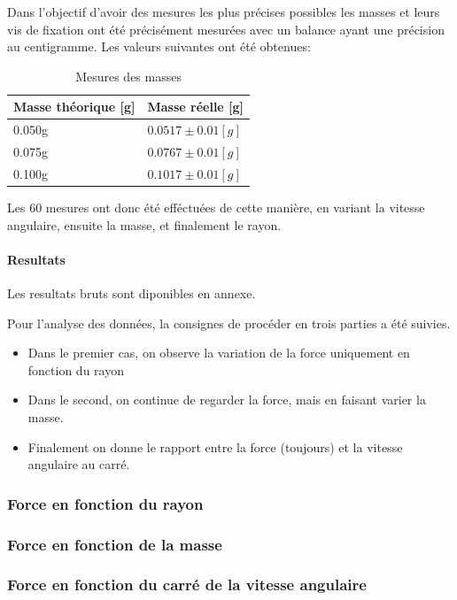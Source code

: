 Dans l'objectif d'avoir des mesures les plus précises possibles les masses et leurs vis de fixation ont été précisément mesurées avec un balance ayant une précision au centigramme. Les valeurs suivantes ont été obtenues:
\begin{table}[ht]
    \caption[Mesure des masses]{Mesures des masses}
    \centering
    \begin{tabular}{|l|l|}
	\hline
	Masse théorique [g] & Masse réelle [g]\\
	\hline
	0.050g & $0.0517 \pm 0.01 [g]$\\
	0.075g & $0.0767 \pm 0.01 [g]$\\
	0.100g & $0.1017 \pm 0.01 [g]$\\
	\hline
    \end{tabular}
\end{table}

Les 60 mesures ont donc été efféctuées de cette manière, en variant la vitesse angulaire, ensuite la masse, et finalement le rayon. 

\paragraph{Resultats}
Les resultats bruts sont diponibles en annexe.

Pour l'analyse des données, la consignes de procéder en trois parties a été suivies.
\begin{itemize}
    \item Dans le premier cas, on observe la variation de la force uniquement en fonction du rayon
    \item Dans le second, on continue de regarder la force, mais en faisant varier la masse.
    \item Finalement on donne le rapport entre la force (toujours) et la vitesse angulaire au carré.
\end{itemize}

\subsubsection{Force en fonction du rayon}

\subsubsection{Force en fonction de la masse}

\newpage
\subsubsection{Force en fonction du carré de la vitesse angulaire}

